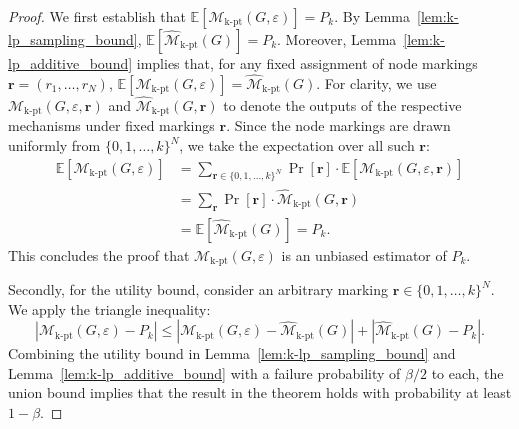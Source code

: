 \begin{proof}
We first establish that $
\mathbb{E}[\mathcal{M}_{\mathrm{k\text{-}pt}}(G, \varepsilon)] = P_k$.
By Lemma~\ref{lem:k-lp_sampling_bound}, $
\mathbb{E}[\widehat{\mathcal{M}}_{\mathrm{k\text{-}pt}}(G)] = P_k$.
Moreover, Lemma~\ref{lem:k-lp_additive_bound} implies that, for any fixed assignment of node markings $\mathbf{r} = (r_1, \dots, r_N)$,
$
\mathbb{E}[\mathcal{M}_{\mathrm{k\text{-}pt}}(G, \varepsilon)] = \widehat{\mathcal{M}}_{\mathrm{k\text{-}pt}}(G)
$.
For clarity, we use $\mathcal{M}_{\mathrm{k\text{-}pt}}(G, \varepsilon, \mathbf{r})$ and $\widehat{\mathcal{M}}_{\mathrm{k\text{-}pt}}(G, \mathbf{r})$ to denote the outputs of the respective mechanisms under fixed markings $\mathbf{r}$. Since the node markings are drawn uniformly from $\{0, 1, \dots, k\}^N$, we take the expectation over all such $\mathbf{r}$:
\begin{align*}
     \mathbb{E}[\mathcal{M}_{\mathrm{k\text{-}pt}}(G, \varepsilon)] 
     &= \sum_{\mathbf{r} \in \{0, 1, \dots, k\}^N} \Pr[\mathbf{r}] \cdot \mathbb{E}[\mathcal{M}_{\mathrm{k\text{-}pt}}(G, \varepsilon,  \mathbf{r})] \\
     &= \sum_{\mathbf{r}} \Pr[\mathbf{r}] \cdot \widehat{\mathcal{M}}_{\mathrm{k\text{-}pt}}(G, \mathbf{r}) \\
     &= \mathbb{E}[\widehat{\mathcal{M}}_{\mathrm{k\text{-}pt}}(G)] = P_k.
\end{align*}
This concludes the proof that $\mathcal{M}_{\mathrm{k\text{-}pt}}(G, \varepsilon)$ is an unbiased estimator of $P_k$.

Secondly, for the utility bound, consider an arbitrary marking $\mathbf{r} \in \{0, 1, \dots, k\}^N$. We apply the triangle inequality:
\begin{equation*}
|\mathcal{M}_{\mathrm{k\text{-}pt}}(G, \varepsilon) - 
    P_k| \leq |\mathcal{M}_{\mathrm{k\text{-}pt}}(G, \varepsilon) - 
    \widehat{\mathcal{M}}_{\mathrm{k\text{-}pt}}(G)| 
    + | \widehat{\mathcal{M}}_{\mathrm{k\text{-}pt}}(G) - P_k|.  
\end{equation*}
Combining the utility bound in Lemma~\ref{lem:k-lp_sampling_bound} and Lemma~\ref{lem:k-lp_additive_bound} with a failure probability of $\beta/2$ to each, the union bound implies that the result in the theorem holds with probability at least $1 - \beta$. \qedhere

\end{proof}










